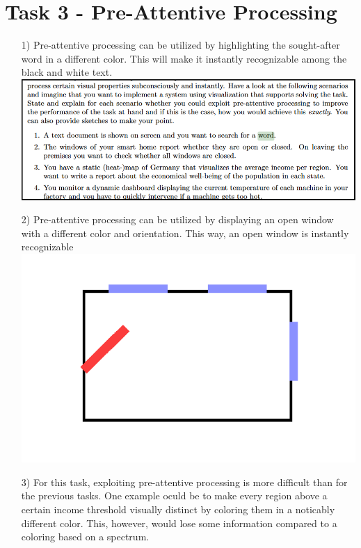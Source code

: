 \documentclass[a4paper]{article}
\begin{document}
\section*{Task 3 - Pre-Attentive Processing}
\begin{enumerate}
	\item[1)]
	Pre-attentive processing can be utilized by highlighting the sought-after word in a different color. This will make it instantly recognizable among the black and white text.\\
	\includegraphics[width=\linewidth]{markedText1.png}
	
	\item[2)]
	Pre-attentive processing can be utilized by displaying an open window with a different color and orientation. This way, an open window is instantly recognizable\\
	
	\includegraphics[width=\linewidth]{openWindow.png}
	
	\item[3)]
	For this task, exploiting pre-attentive processing is more difficult than for the previous tasks. One example oculd be to make every region above a certain income threshold visually distinct by coloring them in a noticably different color. This, however, would lose some information compared to a coloring based on a spectrum.
	

\end{enumerate}
\end{document}
